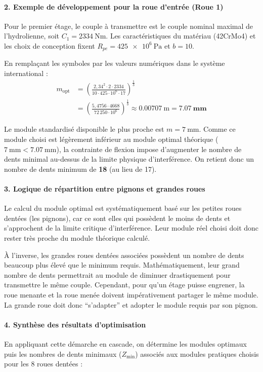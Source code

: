 \documentclass[11pt,a4paper]{article}
\begin{document}
\paragraph{2. Exemple de développement pour la roue d'entrée (Roue 1)}
Pour le premier étage, le couple à transmettre est le couple nominal maximal de l'hydrolienne, soit $C_1 = \qty{2334}{\newton\meter}$. Les caractéristiques du matériau (42CrMo4) et les choix de conception fixent $R_{pe} = \qty{425e6}{\pascal}$ et $b = 10$.

En remplaçant les symboles par les valeurs numériques dans le système international :
\begin{align}
    m_{\text{opt}} &= \left( \frac{2{,}34^2 \cdot 2 \cdot 2334}{10 \cdot 425 \cdot 10^6 \cdot 17} \right)^{\frac{1}{3}} \nonumber \\
    &= \left( \frac{5{,}4756 \cdot 4668}{72\,250 \cdot 10^6} \right)^{\frac{1}{3}} \approx \qty{0.00707}{\meter} = \mathbf{\qty{7.07}{\milli\meter}}
\end{align}

Le module standardisé disponible le plus proche est $m = \qty{7}{\milli\meter}$. Comme ce module choisi est légèrement inférieur au module optimal théorique ($\qty{7}{\milli\meter} < \qty{7.07}{\milli\meter}$), la contrainte de flexion impose d'augmenter le nombre de dents minimal au-dessus de la limite physique d'interférence. On retient donc un nombre de dents minimum de \textbf{18} (au lieu de 17).

\paragraph{3. Logique de répartition entre pignons et grandes roues}
Le calcul du module optimal est systématiquement basé sur les petites roues dentées (les pignons), car ce sont elles qui possèdent le moins de dents et s'approchent de la limite critique d'interférence. Leur module réel choisi doit donc rester très proche du module théorique calculé.

À l'inverse, les grandes roues dentées associées possèdent un nombre de dents beaucoup plus élevé que le minimum requis. Mathématiquement, leur grand nombre de dents permettrait au module de diminuer drastiquement pour transmettre le même couple. Cependant, pour qu'un étage puisse engrener, la roue menante et la roue menée doivent impérativement partager le même module. La grande roue doit donc \enquote{s'adapter} et adopter le module requis par son pignon.

\paragraph{4. Synthèse des résultats d'optimisation}
En appliquant cette démarche en cascade, on détermine les modules optimaux puis les nombres de dents minimaux ($Z_{\min}$) associés aux modules pratiques choisis pour les 8 roues dentées :
\end{document}
